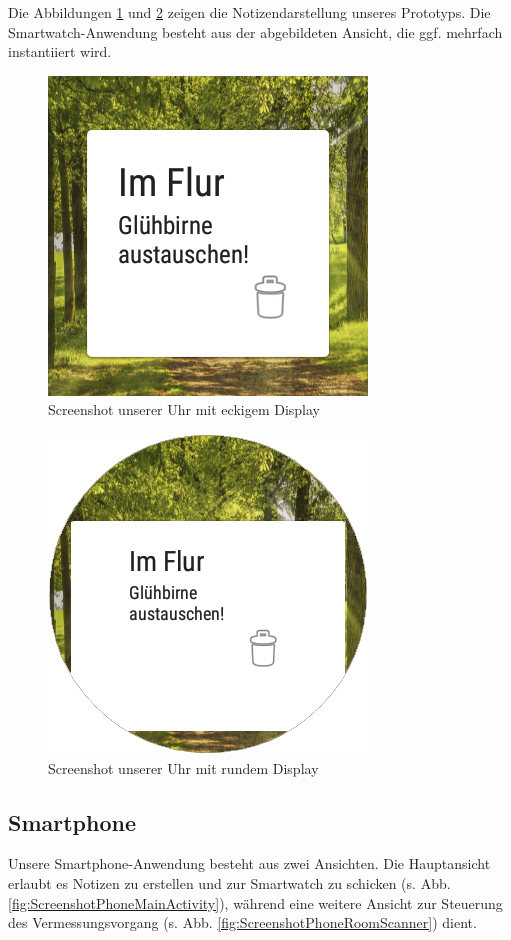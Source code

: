 Die Abbildungen \ref{fig:ScreenshotWatchEckig} und \ref{fig:ScreenshotWatchRund} zeigen
die Notizendarstellung unseres Prototyps. Die Smartwatch-Anwendung besteht aus der abgebildeten Ansicht, die ggf. mehrfach instantiiert wird.

\begin{figure}[H]
\centering
\includegraphics[width=0.3\linewidth]{../Bilder/ScreenshotWatchEckig}
\caption{Screenshot unserer Uhr mit eckigem Display}
\label{fig:ScreenshotWatchEckig}
\end{figure}

\begin{figure}[H]
\centering
\includegraphics[width=0.3\linewidth]{../Bilder/ScreenshotWatchRund}
\caption{Screenshot unserer Uhr mit rundem Display}
\label{fig:ScreenshotWatchRund}
\end{figure}

\subsection{Smartphone}
Unsere Smartphone-Anwendung besteht aus zwei Ansichten. Die Hauptansicht erlaubt es Notizen zu erstellen und zur Smartwatch zu schicken (s. Abb. \ref{fig:ScreenshotPhoneMainActivity}), während eine weitere Ansicht zur Steuerung des Vermessungsvorgang (s. Abb. \ref{fig:ScreenshotPhoneRoomScanner}) dient.
 
